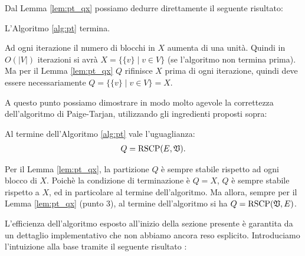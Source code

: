 Dal Lemma \ref{lem:pt_qx} possiamo dedurre direttamente il seguente risultato:
\begin{corollary}
    L'Algoritmo \ref{alg:pt} termina.
\end{corollary}
\begin{proof2}
    Ad ogni iterazione il numero di blocchi in $X$ aumenta di una unità. Quindi in $O(|V|)$ iterazioni si avrà $X = \{\{v\} \mid v \in V\}$ (se l'algoritmo non termina prima). Ma per il Lemma \ref{lem:pt_qx} $Q$ rifinisce $X$ prima di ogni iterazione, quindi deve essere necessariamente $Q = \{\{v\} \mid v \in V\} = X$.
\end{proof2}

A questo punto possiamo dimostrare in modo molto agevole la correttezza dell'algoritmo di Paige-Tarjan, utilizzando gli ingredienti proposti sopra:
\begin{proposition}
    Al termine dell'Algoritmo \ref{alg:pt} vale l'uguaglianza:
    \begin{gather*}
        Q = \textup{RSCP}(E,\mathfrak{V}).
    \end{gather*}
\end{proposition}
\begin{proof2}
    Per il Lemma \ref{lem:pt_qx}, la partizione $Q$ è sempre stabile rispetto ad ogni blocco di $X$. Poichè la condizione di terminazione è $Q=X$, $Q$ è sempre stabile rispetto a $X$, ed in particolare al termine dell'algoritmo. Ma allora, sempre per il Lemma \ref{lem:pt_qx} (punto 3), al termine dell'algoritmo si ha $Q = \textup{RSCP}(\mathfrak{V},E)$.
\end{proof2}

L'efficienza dell'algoritmo esposto all'inizio della sezione presente è garantita da un dettaglio implementativo che non abbiamo ancora reso esplicito. Introduciamo l'intuizione alla base tramite il seguente risultato \cite{paigetarjan}:

